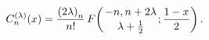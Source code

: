 \[\mathop{C^{(\lambda)}_{n}\/}\nolimits\!\left(x\right)=\frac{\left(2\lambda%
\right)_{n}}{n!}\mathop{F\/}\nolimits\!\left({-n,n+2\lambda\atop\lambda+\frac{%
1}{2}};\frac{1-x}{2}\right).\]